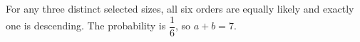 For any three distinct selected sizes, all six orders are equally likely and exactly one is descending. The probability is $\dfrac{1}{6}$, so $a+b=\boxed7$.
